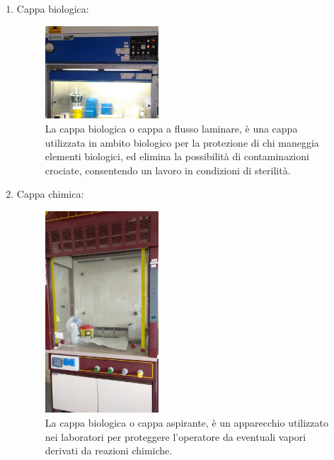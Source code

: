 \documentclass{article}
\begin{document}
\begin{enumerate}
		\item Cappa biologica:

		\begin{figure}[H]

			\includegraphics[width=0.4\textwidth]{./immagini/cappa_biologica.jpg}
			\caption{La cappa biologica o cappa a flusso laminare, è una cappa utilizzata
			in ambito biologico per la protezione di chi maneggia elementi
			biologici, ed elimina la possibilità di contaminazioni crociate,
			consentendo un lavoro in condizioni di sterilità.}
			\label{cappa_biologica}

		\end{figure}

		\vspace{0.5cm}


		\item Cappa chimica:

		\begin{figure}[H]

			\includegraphics[width=0.4\textwidth]{./immagini/cappa_chimica.jpg}
			\caption{La cappa biologica o cappa aspirante, è un apparecchio utilizzato nei
			laboratori per proteggere l'operatore da eventuali vapori derivati da reazioni chimiche.}
			\label{cappa_chimica}


\end{figure}
\end{enumerate}
\end{document}
